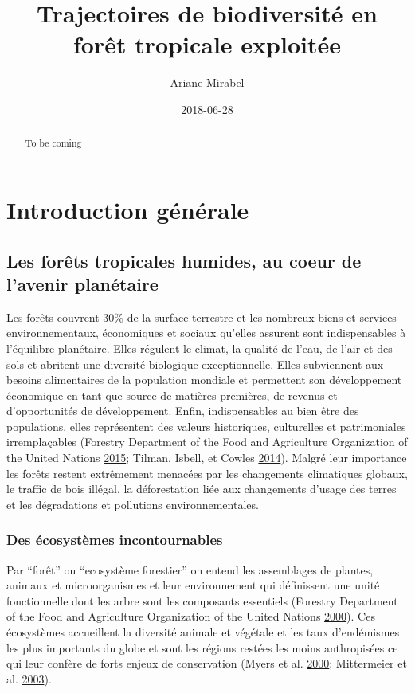 \documentclass[11pt,french,A4paper,extrafontsizes,onecolumn,openright]{memoir}
\title{Trajectoires de biodiversité en forêt tropicale exploitée}
\author{Ariane Mirabel}
\date{2018-06-28}
\begin{document}
\maketitle
\begin{abstract}
To be coming
\end{abstract}

{
\hypersetup{linkcolor=black}
\setcounter{tocdepth}{3}
\tableofcontents
}
\mainmatter

\chapter{Introduction générale}\label{introduction-generale}

\section{Les forêts tropicales humides, au coeur de l'avenir
planétaire}\label{les-forets-tropicales-humides-au-coeur-de-lavenir-planetaire}

Les forêts couvrent 30\% de la surface terrestre et les nombreux biens
et services environnementaux, économiques et sociaux qu'elles assurent
sont indispensables à l'équilibre planétaire. Elles régulent le climat,
la qualité de l'eau, de l'air et des sols et abritent une diversité
biologique exceptionnelle. Elles subviennent aux besoins alimentaires de
la population mondiale et permettent son développement économique en
tant que source de matières premières, de revenus et d'opportunités de
développement. Enfin, indispensables au bien être des populations, elles
représentent des valeurs historiques, culturelles et patrimoniales
irremplaçables (Forestry Department of the Food and Agriculture
Organization of the United Nations
\protect\hyperlink{ref-FRA2015}{2015}; Tilman, Isbell, et Cowles
\protect\hyperlink{ref-Tilman2014}{2014}). Malgré leur importance les
forêts restent extrêmement menacées par les changements climatiques
globaux, le traffic de bois illégal, la déforestation liée aux
changements d'usage des terres et les dégradations et pollutions
environnementales.

\subsection{Des écosystèmes
incontournables}\label{des-ecosystemes-incontournables}

Par ``forêt'' ou ``ecosystème forestier'' on entend les assemblages de
plantes, animaux et microorganismes et leur environnement qui
définissent une unité fonctionnelle dont les arbre sont les composants
essentiels (Forestry Department of the Food and Agriculture Organization
of the United Nations \protect\hyperlink{ref-FRA2000}{2000}). Ces
écosystèmes accueillent la diversité animale et végétale et les taux
d'endémismes les plus importants du globe et sont les régions restées
les moins anthropisées ce qui leur confère de forts enjeux de
conservation (Myers et al. \protect\hyperlink{ref-Myers2000}{2000};
Mittermeier et al. \protect\hyperlink{ref-Mittermeier2003}{2003}).
\end{document}
